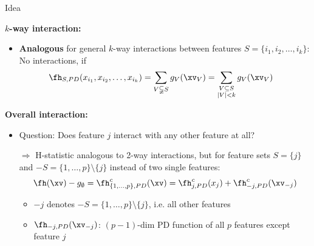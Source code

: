 \documentclass[11pt,compress,t,notes=noshow, aspectratio=169, xcolor=table]{beamer}
\begin{document}
\begin{frame}{Idea }

\textbf{$k$-way interaction:}
\begin{itemize}
    \item \textbf{Analogous} for general $k$-way interactions between features $S = \{ i_1, i_2, \dots, i_k \}$: No interactions, if
    \begin{align*}
        &\fh_{S, PD}( x_{i_1}, x_{i_2}, \dots, x_{i_k} )
        = \sum_{V \subsetneqq S} g_{V}(\xv_V)
        = \sum_{\substack{V \subseteq S \\ |V|<k}} g_{V}(\xv_V)
    \end{align*}
\end{itemize}
\pause
\textbf{Overall interaction:}
\begin{itemize}
    \item Question: Does feature $j$ interact with any other feature at all?
    \item[$\Rightarrow$] H-statistic analogous to 2-way interactions, but for feature sets $S = \{j\}$ and $-S = \{1, \dots, p\}\setminus \{j\}$ instead of two single features: \\
    \pause
    $$
    \fh(\xv) - g_\emptyset
    = \fh^c_{\{1, \dots, p\}, PD}(\xv)
    = \fh^c_{j, PD}(x_j) +  \fh^c_{-j, PD}(\xv_{-j})
    $$
    \begin{itemize}
        \item $-j$ denotes $-S = \{1, \dots, p\}\setminus \{j\}$, i.e. all other features
    	\item $\fh_{-j, PD}(\xv_{-j})$: $(p-1)$-dim PD function of all $p$ features except feature $j$
    \end{itemize}
\end{itemize}
    
\end{frame}
\end{document}
